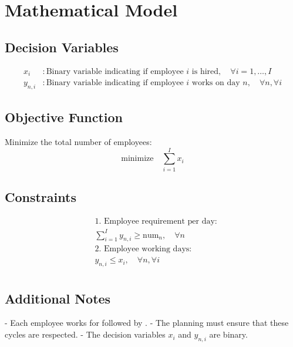 \documentclass{article}
\begin{document}
\section*{Mathematical Model}

\subsection*{Decision Variables}
\begin{align*}
x_i & : \text{Binary variable indicating if employee } i \text{ is hired}, \quad \forall i = 1, \ldots, I\\
y_{n,i} & : \text{Binary variable indicating if employee } i \text{ works on day } n, \quad \forall n, \forall i
\end{align*}

\subsection*{Objective Function}
Minimize the total number of employees:
\[
\text{minimize} \quad \sum_{i=1}^{I} x_i
\]

\subsection*{Constraints}
\begin{align*}
& \text{1. Employee requirement per day:}\\
& \sum_{i=1}^{I} y_{n,i} \geq \text{num}_n, \quad \forall n\\
& \text{2. Employee working days:}\\
& y_{n,i} \leq x_i, \quad \forall n, \forall i\\
\end{align*}

\subsection*{Additional Notes}
- Each employee works for  followed by .
- The planning must ensure that these cycles are respected.
- The decision variables \( x_i \) and \( y_{n,i} \) are binary.
\end{document}

